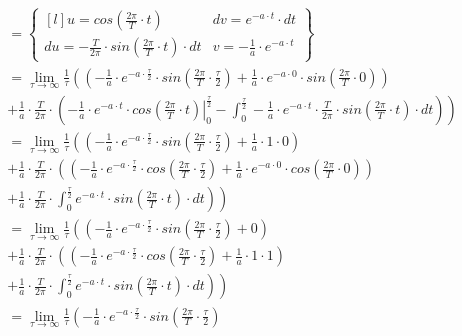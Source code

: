 \begin{align*}
 &=\begin{Bmatrix*}[l]
 u=cos(\frac{2\pi}{T}\cdot t) & dv = e^{-a \cdot t}\cdot dt\\ 
 du=-\frac{T}{2\pi} \cdot sin(\frac{2\pi}{T}\cdot t)\cdot dt & v=-\frac{1}{a}\cdot e^{-a\cdot t}
 \end{Bmatrix*}\\
 &=\lim_{\tau \rightarrow \infty }\frac{1}{\tau}\left(
 \left( -\frac{1}{a}\cdot e^{-a\cdot \frac{\tau}{2}} \cdot sin \left(\frac{2\pi}{T}\cdot \frac{\tau}{2}\right) + \frac{1}{a}\cdot e^{-a\cdot 0} \cdot sin \left(\frac{2\pi}{T}\cdot 0\right) \right)\right.\\
 &\left.+\frac{1}{a} \cdot \frac{T}{2\pi} \cdot 
 \left(
 \left. -\frac{1}{a}\cdot e^{-a\cdot t} \cdot cos \left(\frac{2\pi}{T}\cdot t\right) \right|_{0}^{\frac{\tau}{2}}
 -\int_{0}^{\frac{\tau}{2}} -\frac{1}{a}\cdot e^{-a\cdot t} \cdot \frac{T}{2\pi} \cdot sin\left(\frac{2\pi}{T}\cdot t\right)\cdot dt
 \right)
 \right)\\
 &=\lim_{\tau \rightarrow \infty }\frac{1}{\tau}\left(
 \left( -\frac{1}{a}\cdot e^{-a\cdot \frac{\tau}{2}} \cdot sin \left(\frac{2\pi}{T}\cdot \frac{\tau}{2}\right) + \frac{1}{a}\cdot 1 \cdot 0 \right)\right.\\
 &\left.+\frac{1}{a} \cdot \frac{T}{2\pi} \cdot 
 \left(
 \left( -\frac{1}{a}\cdot e^{-a\cdot \frac{\tau}{2}} \cdot cos \left(\frac{2\pi}{T}\cdot \frac{\tau}{2}\right) + \frac{1}{a}\cdot e^{-a\cdot 0} \cdot cos \left(\frac{2\pi}{T}\cdot 0\right) \right)
 \right.\right. \\
 &\left.\left.+\frac{1}{a}\cdot \frac{T}{2\pi} \cdot \int_{0}^{\frac{\tau}{2}} e^{-a\cdot t} \cdot  sin\left(\frac{2\pi}{T}\cdot t\right)\cdot dt
 \right)
 \right)\\
 &=\lim_{\tau \rightarrow \infty }\frac{1}{\tau}\left(
 \left( -\frac{1}{a}\cdot e^{-a\cdot \frac{\tau}{2}} \cdot sin \left(\frac{2\pi}{T}\cdot \frac{\tau}{2}\right) + 0 \right)\right.\\
 &\left.+\frac{1}{a} \cdot \frac{T}{2\pi} \cdot 
 \left(
 \left( -\frac{1}{a}\cdot e^{-a\cdot \frac{\tau}{2}} \cdot cos \left(\frac{2\pi}{T}\cdot \frac{\tau}{2}\right) + \frac{1}{a}\cdot 1 \cdot 1 \right)
 \right.\right. \\
 &\left.\left.+\frac{1}{a}\cdot \frac{T}{2\pi} \cdot \int_{0}^{\frac{\tau}{2}} e^{-a\cdot t} \cdot  sin\left(\frac{2\pi}{T}\cdot t\right)\cdot dt
 \right)
 \right)\\
 &=\lim_{\tau \rightarrow \infty }\frac{1}{\tau}\left(
 -\frac{1}{a}\cdot e^{-a\cdot \frac{\tau}{2}} \cdot sin \left(\frac{2\pi}{T}\cdot \frac{\tau}{2}\right)\right.\\

\end{align*}
